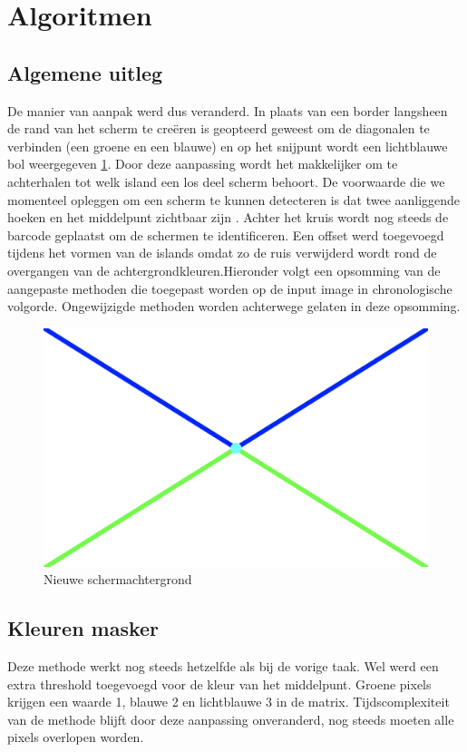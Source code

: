 \section{Algoritmen}
\subsection{Algemene uitleg}
De manier van aanpak werd dus veranderd. In plaats van een border langsheen de rand van het scherm te creëren is geopteerd geweest om de diagonalen te verbinden (een groene en een blauwe) en op het snijpunt wordt een lichtblauwe bol weergegeven \ref{fig:screen}. Door deze aanpassing wordt het makkelijker om te achterhalen tot welk island een los deel scherm behoort. De voorwaarde die we momenteel opleggen om een scherm te kunnen detecteren is dat twee aanliggende hoeken en het middelpunt zichtbaar zijn \label{voorwaarde}. Achter het kruis wordt nog steeds de barcode geplaatst om de schermen te identificeren.
Een offset werd toegevoegd tijdens het vormen van de islands omdat zo de ruis verwijderd wordt rond de overgangen van de achtergrondkleuren.Hieronder volgt een opsomming van de aangepaste methoden die toegepast worden op de input image in chronologische volgorde. Ongewijzigde methoden worden achterwege gelaten in deze opsomming.

\begin{figure} [h]
	\center
	\includegraphics[width=\textwidth]{screen}
	\caption{Nieuwe schermachtergrond}
	\label{fig:screen}
\end{figure}

\subsection{Kleuren masker}
Deze methode werkt nog steeds hetzelfde als bij de vorige taak. Wel werd een extra threshold toegevoegd voor de kleur van het middelpunt. Groene pixels krijgen een waarde 1, blauwe 2 en lichtblauwe 3 in de matrix. Tijdscomplexiteit van de methode blijft door deze aanpassing onveranderd, nog steeds moeten alle pixels overlopen worden.

